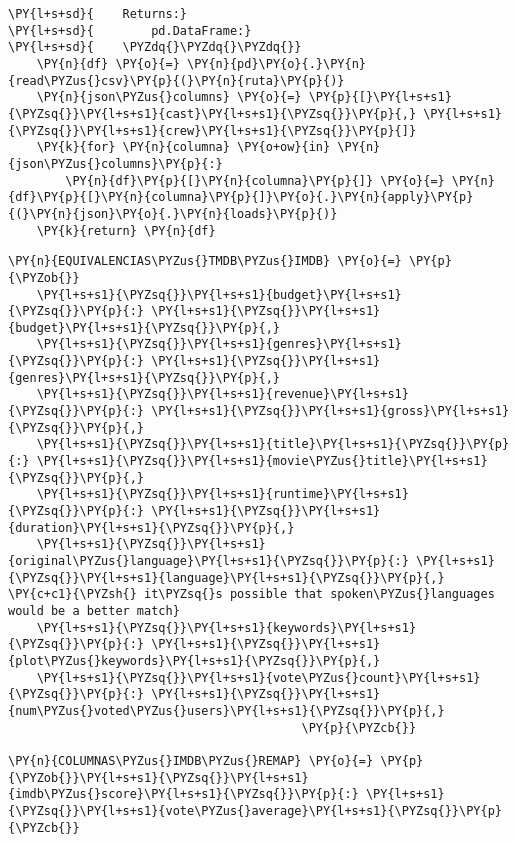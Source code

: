 \begin{tcolorbox}[breakable, size=fbox, boxrule=1pt, pad at break*=1mm,colback=cellbackground, colframe=cellborder]
\begin{Verbatim}[commandchars=\\\{\}]
\PY{l+s+sd}{    Returns:}
\PY{l+s+sd}{        pd.DataFrame:}
\PY{l+s+sd}{    \PYZdq{}\PYZdq{}\PYZdq{}}
    \PY{n}{df} \PY{o}{=} \PY{n}{pd}\PY{o}{.}\PY{n}{read\PYZus{}csv}\PY{p}{(}\PY{n}{ruta}\PY{p}{)}
    \PY{n}{json\PYZus{}columns} \PY{o}{=} \PY{p}{[}\PY{l+s+s1}{\PYZsq{}}\PY{l+s+s1}{cast}\PY{l+s+s1}{\PYZsq{}}\PY{p}{,} \PY{l+s+s1}{\PYZsq{}}\PY{l+s+s1}{crew}\PY{l+s+s1}{\PYZsq{}}\PY{p}{]}
    \PY{k}{for} \PY{n}{columna} \PY{o+ow}{in} \PY{n}{json\PYZus{}columns}\PY{p}{:}
        \PY{n}{df}\PY{p}{[}\PY{n}{columna}\PY{p}{]} \PY{o}{=} \PY{n}{df}\PY{p}{[}\PY{n}{columna}\PY{p}{]}\PY{o}{.}\PY{n}{apply}\PY{p}{(}\PY{n}{json}\PY{o}{.}\PY{n}{loads}\PY{p}{)}
    \PY{k}{return} \PY{n}{df}
\end{Verbatim}
\end{tcolorbox}

    \begin{tcolorbox}[breakable, size=fbox, boxrule=1pt, pad at break*=1mm,colback=cellbackground, colframe=cellborder]
\begin{Verbatim}[commandchars=\\\{\}]
\PY{n}{EQUIVALENCIAS\PYZus{}TMDB\PYZus{}IMDB} \PY{o}{=} \PY{p}{\PYZob{}}
    \PY{l+s+s1}{\PYZsq{}}\PY{l+s+s1}{budget}\PY{l+s+s1}{\PYZsq{}}\PY{p}{:} \PY{l+s+s1}{\PYZsq{}}\PY{l+s+s1}{budget}\PY{l+s+s1}{\PYZsq{}}\PY{p}{,}
    \PY{l+s+s1}{\PYZsq{}}\PY{l+s+s1}{genres}\PY{l+s+s1}{\PYZsq{}}\PY{p}{:} \PY{l+s+s1}{\PYZsq{}}\PY{l+s+s1}{genres}\PY{l+s+s1}{\PYZsq{}}\PY{p}{,}
    \PY{l+s+s1}{\PYZsq{}}\PY{l+s+s1}{revenue}\PY{l+s+s1}{\PYZsq{}}\PY{p}{:} \PY{l+s+s1}{\PYZsq{}}\PY{l+s+s1}{gross}\PY{l+s+s1}{\PYZsq{}}\PY{p}{,}
    \PY{l+s+s1}{\PYZsq{}}\PY{l+s+s1}{title}\PY{l+s+s1}{\PYZsq{}}\PY{p}{:} \PY{l+s+s1}{\PYZsq{}}\PY{l+s+s1}{movie\PYZus{}title}\PY{l+s+s1}{\PYZsq{}}\PY{p}{,}
    \PY{l+s+s1}{\PYZsq{}}\PY{l+s+s1}{runtime}\PY{l+s+s1}{\PYZsq{}}\PY{p}{:} \PY{l+s+s1}{\PYZsq{}}\PY{l+s+s1}{duration}\PY{l+s+s1}{\PYZsq{}}\PY{p}{,}
    \PY{l+s+s1}{\PYZsq{}}\PY{l+s+s1}{original\PYZus{}language}\PY{l+s+s1}{\PYZsq{}}\PY{p}{:} \PY{l+s+s1}{\PYZsq{}}\PY{l+s+s1}{language}\PY{l+s+s1}{\PYZsq{}}\PY{p}{,}  \PY{c+c1}{\PYZsh{} it\PYZsq{}s possible that spoken\PYZus{}languages would be a better match}
    \PY{l+s+s1}{\PYZsq{}}\PY{l+s+s1}{keywords}\PY{l+s+s1}{\PYZsq{}}\PY{p}{:} \PY{l+s+s1}{\PYZsq{}}\PY{l+s+s1}{plot\PYZus{}keywords}\PY{l+s+s1}{\PYZsq{}}\PY{p}{,}
    \PY{l+s+s1}{\PYZsq{}}\PY{l+s+s1}{vote\PYZus{}count}\PY{l+s+s1}{\PYZsq{}}\PY{p}{:} \PY{l+s+s1}{\PYZsq{}}\PY{l+s+s1}{num\PYZus{}voted\PYZus{}users}\PY{l+s+s1}{\PYZsq{}}\PY{p}{,}
                                         \PY{p}{\PYZcb{}}

\PY{n}{COLUMNAS\PYZus{}IMDB\PYZus{}REMAP} \PY{o}{=} \PY{p}{\PYZob{}}\PY{l+s+s1}{\PYZsq{}}\PY{l+s+s1}{imdb\PYZus{}score}\PY{l+s+s1}{\PYZsq{}}\PY{p}{:} \PY{l+s+s1}{\PYZsq{}}\PY{l+s+s1}{vote\PYZus{}average}\PY{l+s+s1}{\PYZsq{}}\PY{p}{\PYZcb{}}
\end{Verbatim}
\end{tcolorbox}

